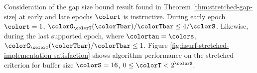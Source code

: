 

Consideration of the gap size bound result found in Theorem \ref{thm:stretched-gap-size} at early and late epochs $\colort$ is instructive.
During early epoch $\colort = 1$, $\colorG_{\colorT}(\colorTbar)/\colorTbar \leq 4/\colorS$.
Likewise, during the last supported epoch, where $\colortau = \colors$, $\colorG_{\colorT}(\colorTbar)/\colorTbar \leq 1$.
Figure \ref{fig:hsurf-stretched-implementation-satisfaction} shows algorithm performance on the stretched criterion for buffer size $\colorS=16$, $0 \leq \colorT < 2^{\colorS}$.




